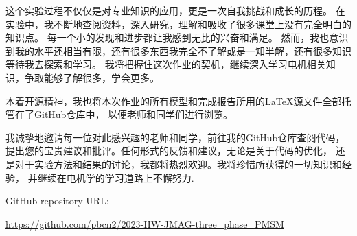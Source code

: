 \documentclass{thuemp}
\begin{document}
这个实验过程不仅仅是对专业知识的应用，更是一次自我挑战和成长的历程。
在实验中，我不断地查阅资料，深入研究，理解和吸收了很多课堂上没有完全明白的知识点。
每一个小的发现和进步都让我感到无比的兴奋和满足。
然而，我也意识到我的水平还相当有限，还有很多东西我完全不了解或是一知半解，还有很多知识等待我去探索和学习。
我将把握住这次作业的契机，继续深入学习电机相关知识，争取能够了解很多，学会更多。

本着开源精神，我也将本次作业的所有模型和完成报告所用的\LaTeX 源文件全部托管在了GitHub仓库中，
以便老师和同学们进行浏览。

我诚挚地邀请每一位对此感兴趣的老师和同学，前往我的GitHub仓库查阅代码，
提出您的宝贵建议和批评。任何形式的反馈和建议，无论是关于代码的优化，
还是对于实验方法和结果的讨论，我都将热烈欢迎。我将珍惜所获得的一切知识和经验，
并继续在电机学的学习道路上不懈努力.


GitHub repository URL: 

\href{https://github.com/pbcn2/2023-HW-JMAG-three\_phase\_PMSM}{https://github.com/pbcn2/2023-HW-JMAG-three\_phase\_PMSM}


\renewcommand\refname{\heiti\wuhao\centerline{参考文献}\global\def\refname{参考文献}}
\vskip 12pt

\let\OLDthebibliography\thebibliography
\renewcommand\thebibliography[1]{
  \OLDthebibliography{#1}
  \setlength{\parskip}{0pt}
  \setlength{\itemsep}{0pt plus 0.3ex}
}

{
\renewcommand{\baselinestretch}{0.9}
\liuhao


}
\end{document}
